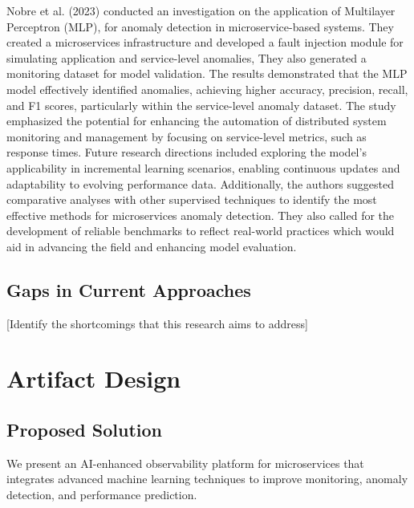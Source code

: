 \documentclass[10pt,journal,compsoc]{IEEEtran}
\begin{document}
Nobre et al. (2023) conducted an investigation on the application of Multilayer Perceptron (MLP), for anomaly detection in microservice-based systems. They created a microservices infrastructure and developed a fault injection module for simulating application and service-level anomalies, They also generated  a monitoring dataset for model validation. The results demonstrated that the MLP model effectively identified anomalies, achieving higher accuracy, precision, recall, and F1 scores, particularly within the service-level anomaly dataset. The study emphasized the potential for enhancing the automation of distributed system monitoring and management by focusing on service-level metrics, such as response times. Future research directions included exploring the model's applicability in incremental learning scenarios, enabling continuous updates and adaptability to evolving performance data. Additionally, the authors suggested comparative analyses with other supervised techniques to identify the most effective methods for microservices anomaly detection. They also called for the development of reliable benchmarks to reflect real-world practices which would aid in advancing the field and enhancing model evaluation\cite{nobre2023anomaly}.



\subsection{Gaps in Current Approaches}
[Identify the shortcomings that this research aims to address]

\section{Artifact Design}
\subsection{Proposed Solution}
We present an AI-enhanced observability platform for microservices that integrates advanced machine learning techniques to improve monitoring, anomaly detection, and performance prediction.
\end{document}
